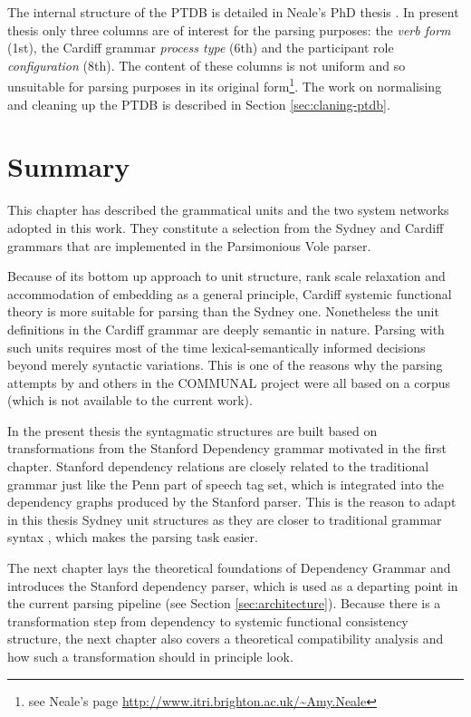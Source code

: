     The internal structure of the PTDB is detailed in Neale's PhD thesis \citep[193--231]{Neale2002}. In present thesis only three columns are of interest for the parsing purposes: the \textit{verb form} (1st), the Cardiff grammar \textit{process type} (6th) and the participant role \textit{configuration} (8th). The content of these columns is not uniform and so unsuitable for parsing purposes in its original form\footnote{see Neale's page  \url{http://www.itri.brighton.ac.uk/~Amy.Neale}}. The work on normalising and cleaning up the PTDB is described in Section \ref{sec:claning-ptdb}.


\section{Summary}
    This chapter has described the grammatical units and the two system networks adopted in this work. They constitute a selection from the Sydney and Cardiff grammars that are implemented in the Parsimonious Vole parser.
    
    Because of its bottom up approach to unit structure, rank scale relaxation and accommodation of embedding as a general principle, Cardiff systemic functional theory is more suitable for parsing than the Sydney one. Nonetheless the unit definitions in the Cardiff grammar are deeply semantic in nature. Parsing with such units requires most of the time lexical-semantically informed decisions beyond merely syntactic variations. This is one of the reasons why the parsing attempts by \citet{ODonoghue1991a} and others in the COMMUNAL project were all based on a corpus (which is not available to the current work). 
    
    In the present thesis the syntagmatic structures are built based on transformations from the Stanford Dependency grammar motivated in the first chapter. Stanford dependency relations are closely related to the traditional grammar just like the Penn part of speech tag set, which is integrated into the dependency graphs produced by the Stanford parser. This is the reason to adapt in this thesis Sydney unit structures as they are closer to traditional grammar syntax \citep{Quirk1985}, which makes the parsing task easier.
    
    The next chapter lays the theoretical foundations of Dependency Grammar and introduces the Stanford dependency parser, which is used as a departing point in the current parsing pipeline (see Section \ref{sec:architecture}). Because there is a transformation step from dependency to systemic functional consistency structure, the next chapter also covers a theoretical compatibility analysis and how such a transformation should in principle look. 

